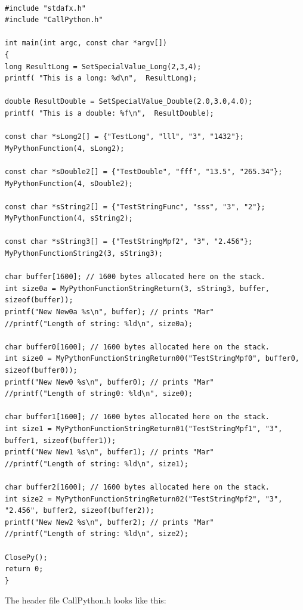 \begin{lstlisting}

#include "stdafx.h"
#include "CallPython.h"

int main(int argc, const char *argv[])
{
long ResultLong = SetSpecialValue_Long(2,3,4);
printf( "This is a long: %d\n",  ResultLong);

double ResultDouble = SetSpecialValue_Double(2.0,3.0,4.0);
printf( "This is a double: %f\n",  ResultDouble);

const char *sLong2[] = {"TestLong", "lll", "3", "1432"};
MyPythonFunction(4, sLong2);

const char *sDouble2[] = {"TestDouble", "fff", "13.5", "265.34"};
MyPythonFunction(4, sDouble2);

const char *sString2[] = {"TestStringFunc", "sss", "3", "2"};
MyPythonFunction(4, sString2);

const char *sString3[] = {"TestStringMpf2", "3", "2.456"};
MyPythonFunctionString2(3, sString3);

char buffer[1600]; // 1600 bytes allocated here on the stack.
int size0a = MyPythonFunctionStringReturn(3, sString3, buffer, sizeof(buffer));
printf("New New0a %s\n", buffer); // prints "Mar"
//printf("Length of string: %ld\n", size0a);

char buffer0[1600]; // 1600 bytes allocated here on the stack.
int size0 = MyPythonFunctionStringReturn00("TestStringMpf0", buffer0, sizeof(buffer0));
printf("New New0 %s\n", buffer0); // prints "Mar"
//printf("Length of string0: %ld\n", size0);

char buffer1[1600]; // 1600 bytes allocated here on the stack.
int size1 = MyPythonFunctionStringReturn01("TestStringMpf1", "3", buffer1, sizeof(buffer1));
printf("New New1 %s\n", buffer1); // prints "Mar"
//printf("Length of string: %ld\n", size1);

char buffer2[1600]; // 1600 bytes allocated here on the stack.
int size2 = MyPythonFunctionStringReturn02("TestStringMpf2", "3", "2.456", buffer2, sizeof(buffer2));
printf("New New2 %s\n", buffer2); // prints "Mar"
//printf("Length of string: %ld\n", size2);

ClosePy();
return 0;
}

\end{lstlisting}

The header file CallPython.h looks like this:

